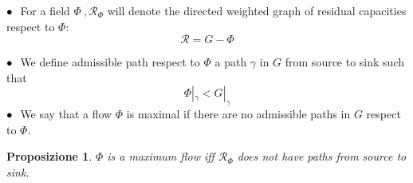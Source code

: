 \documentclass{article}
\theoremstyle{plain}
\newtheorem{prop}[teo]{Proposizione}
\theoremstyle{remark}
\begin{document}
                                                                                                                                                                                                                                                                                                                                                                                                                                                                                                                                                                                                                                                                                                                                                                                                                                                                                                                                                                                                                                                   

 $\small\bullet\ $ For a field $\Phi\ , \mathcal{R}_{\Phi}$ will denote the directed weighted graph of residual capacities respect to $\Phi$:
\begin{equation}
\label{eq:residual-capacity}
\mathcal{R} =
    G-\Phi
\end{equation}

$\small\bullet\ $  We define admissible path respect to $\Phi$  a path $\gamma$ in $G$ from source to sink such that 
\begin{equation*}
\Phi|_{\gamma} < G|_{\gamma}
\end{equation*}
$\small\bullet\ $ We say that a flow $\Phi$ is maximal if there are no admissible paths in $G$ respect to $\Phi$.

\begin{prop}
$\Phi$ is a maximum flow iff $\mathcal{R}_{\Phi}$ does not have paths from source to sink.\\ \\ \\ \\
\end{prop}
\end{document}
